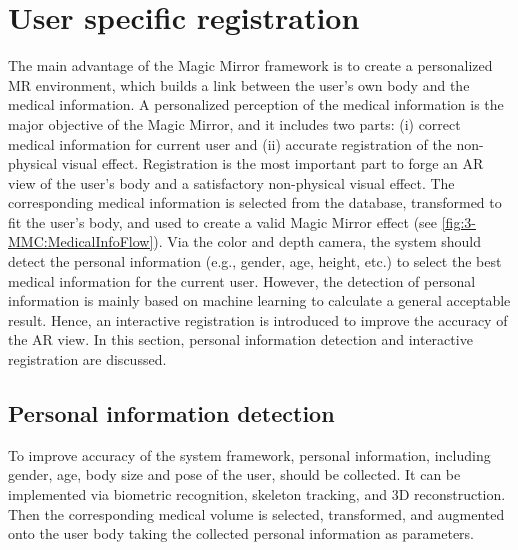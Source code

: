 \section{User specific registration} \label{sec:3-PPMM:Registration}
The main advantage of the Magic Mirror framework is to create a personalized MR environment, which builds a link between the user's own body and the medical information. A personalized perception of the medical information is the major objective of the Magic Mirror, and it includes two parts: (i) correct medical information for current user and (ii) accurate registration of the non-physical visual effect. Registration is the most important part to forge an AR view of the user's body and a satisfactory non-physical visual effect.
The corresponding medical information is selected from the database, transformed to fit the user's body, and used to create a valid Magic Mirror effect (see \figurename{\ref{fig:3-MMC:MedicalInfoFlow}}). Via the color and depth camera, the system should detect the personal information (e.g., gender, age, height, etc.) to select the best medical information for the current user. 
However, the detection of personal information is mainly based on machine learning to calculate a general acceptable result. 
Hence, an interactive registration is introduced to improve the accuracy of the AR view.
In this section, personal information detection and interactive registration are discussed.

\subsection{Personal information detection}
To improve accuracy of the system framework, personal information, including gender, age, body size and pose of the user, should be collected. It can be implemented via biometric recognition, skeleton tracking, and 3D reconstruction. Then the corresponding medical volume is selected, transformed, and augmented onto the user body taking the collected personal information as parameters. 

